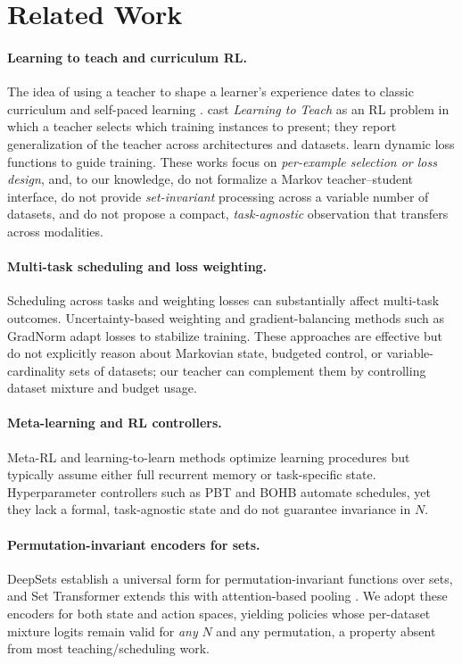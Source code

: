 \documentclass[11pt]{article}
\newcommand{\1}{\mathbf{1}}
\begin{document}
\section{Related Work}
\paragraph{Learning to teach and curriculum RL.} The idea of using a teacher to shape a learner’s experience dates to classic curriculum and self-paced learning \citep{bengio2009curriculum,kumar2010selfpaced}. \citet{fan2018l2t} cast \emph{Learning to Teach} as an RL problem in which a teacher selects which training instances to present; they report generalization of the teacher across architectures and datasets. \citet{wu2018l2tloss} learn dynamic loss functions to guide training. These works focus on \emph{per-example selection or loss design}, and, to our knowledge, do not formalize a Markov teacher--student interface, do not provide \emph{set-invariant} processing across a variable number of datasets, and do not propose a compact, \emph{task-agnostic} observation that transfers across modalities.

\paragraph{Multi-task scheduling and loss weighting.} Scheduling across tasks and weighting losses can substantially affect multi-task outcomes. Uncertainty-based weighting \citep{kendall2018uncertainty} and gradient-balancing methods such as GradNorm \citep{chen2018gradnorm} adapt losses to stabilize training. These approaches are effective but do not explicitly reason about Markovian state, budgeted control, or variable-cardinality sets of datasets; our teacher can complement them by controlling dataset mixture and budget usage.

\paragraph{Meta-learning and RL controllers.} Meta-RL and learning-to-learn methods \citep{duan2016rl2,finn2017maml} optimize learning procedures but typically assume either full recurrent memory or task-specific state. Hyperparameter controllers such as PBT and BOHB \citep{jaderberg2017pbt,falkner2018bohb,snoek2012practical} automate schedules, yet they lack a formal, task-agnostic state and do not guarantee invariance in $N$.

\paragraph{Permutation-invariant encoders for sets.} DeepSets \citep{zaheer2017deepsets} establish a universal form for permutation-invariant functions over sets, and Set Transformer extends this with attention-based pooling \citep{lee2019settransformer}. We adopt these encoders for both state and action spaces, yielding policies whose per-dataset mixture logits remain valid for \emph{any} $N$ and any permutation, a property absent from most teaching/scheduling work.
\end{document}
